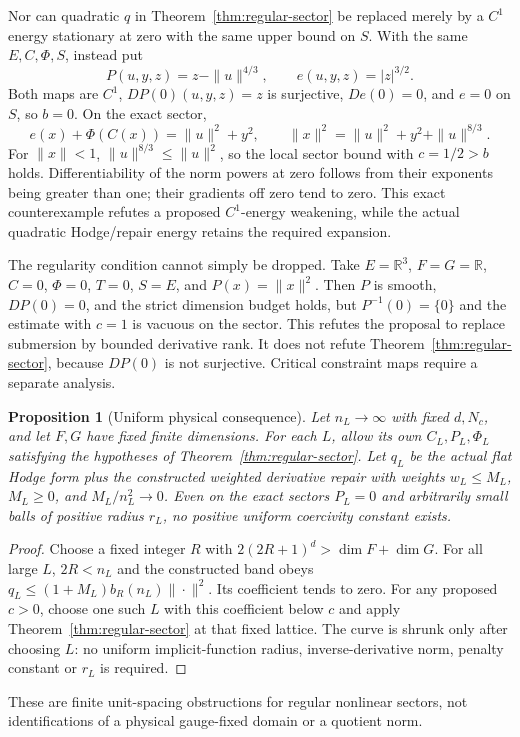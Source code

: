 \documentclass[11pt]{article}
\newtheorem{proposition}[theorem]{Proposition}
\newcommand{\R}{\mathbb R}
\begin{document}
Nor can quadratic $q$ in Theorem~\ref{thm:regular-sector} be replaced merely
by a $C^1$ energy stationary at zero with the same upper bound on $S$.
With the same $E,C,\Phi,S$, instead put
\[
 P(u,y,z)=z-\|u\|^{4/3},\qquad e(u,y,z)=|z|^{3/2}.
\]
Both maps are $C^1$, $DP(0)(u,y,z)=z$ is surjective, $De(0)=0$, and $e=0$
on $S$, so $b=0$. On the exact sector,
\[
 e(x)+\Phi(C(x))=\|u\|^2+y^2,\qquad
 \|x\|^2=\|u\|^2+y^2+\|u\|^{8/3}.
\]
For $\|x\|<1$, $\|u\|^{8/3}\le\|u\|^2$, so the local sector bound with
$c=1/2>b$ holds. Differentiability of the norm powers at zero follows from
their exponents being greater than one; their gradients off zero tend to
zero. This exact counterexample refutes a proposed $C^1$-energy weakening,
while the actual quadratic Hodge/repair energy retains the required expansion.

The regularity condition cannot simply be dropped. Take $E=\R^3$,
$F=G=\R$, $C=0$, $\Phi=0$, $T=0$, $S=E$, and $P(x)=\|x\|^2$.
Then $P$ is smooth, $DP(0)=0$, and the strict dimension budget holds, but
$P^{-1}(0)=\{0\}$ and the estimate with $c=1$ is vacuous on the sector.
This refutes the proposal to replace submersion by bounded derivative rank.
It does not refute Theorem~\ref{thm:regular-sector}, because $DP(0)$ is not
surjective. Critical constraint maps require a separate analysis.

\begin{proposition}[Uniform physical consequence]\label{prop:regular-uniform}
Let $n_L\to\infty$ with fixed $d,N_c$, and let $F,G$ have fixed finite dimensions.
For each $L$, allow its own $C_L,P_L,\Phi_L$ satisfying the hypotheses of
Theorem~\ref{thm:regular-sector}. Let $q_L$ be the actual flat Hodge form plus
the constructed weighted derivative repair with weights $w_L\le M_L$,
$M_L\ge0$, and $M_L/n_L^2\to0$. Even on the exact sectors $P_L=0$ and
arbitrarily small balls of positive radius $r_L$, no positive uniform
coercivity constant exists.
\end{proposition}
\begin{proof}
Choose a fixed integer $R$ with $2(2R+1)^d>\dim F+\dim G$. For all large $L$,
$2R<n_L$ and the constructed band obeys
$q_L\le (1+M_L)b_R(n_L)\|\cdot\|^2$. Its coefficient tends to zero.
For any proposed $c>0$, choose one such $L$ with this coefficient below $c$
and apply Theorem~\ref{thm:regular-sector} at that fixed lattice.
The curve is shrunk only after choosing $L$: no uniform implicit-function
radius, inverse-derivative norm, penalty constant or $r_L$ is required.
\end{proof}
These are finite unit-spacing obstructions for regular nonlinear sectors,
not identifications of a physical gauge-fixed domain or a quotient norm.
\end{document}
